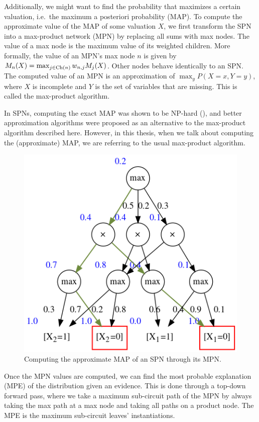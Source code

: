 Additionally, we might want to find the probability that maximizes a certain valuation, i.e.\ the
maximum a posteriori probability (MAP). To compute the approximate value of the MAP of some
valuation $X$, we first transform the SPN into a max-product network (MPN) by replacing all sums
with max nodes. The value of a max node is the maximum value of its weighted children. More
formally, the value of an MPN's max node $n$ is given by $M_n(X)=\max_{j\in\operatorname*{\text{Ch}}(n)} w_{n,j}M_j(X)$.
Other nodes behave identically to an SPN\@. The computed value of an MPN is an approximation of
$\max_y P(X=x, Y=y)$, where $X$ is incomplete and $Y$ is the set of variables that are missing.
This is called the max-product algorithm.

In SPNs, computing the exact MAP was shown to be NP-hard (\cite{theoretical-spn,cmc2017,mei2018}),
and better approximation algorithms were proposed as an alternative to the max-product algorithm
described here. However, in this thesis, when we talk about computing the (approximate) MAP, we are
referring to the usual max-product algorithm.

\begin{figure}[h]
  \centering\includegraphics[scale=0.6]{graphs/sample_mpn_prob.png}
  \caption{Computing the approximate MAP of an SPN through its MPN.\label{fig:sample_mpn_prob}}
\end{figure}

Once the MPN values are computed, we can find the most probable explanation (MPE) of the
distribution given an evidence. This is done through a top-down forward pass, where we take a
maximum sub-circuit path of the MPN by always taking the max path at a max node and taking all
paths on a product node. The MPE is the maximum sub-circuit leaves' instantiations.


